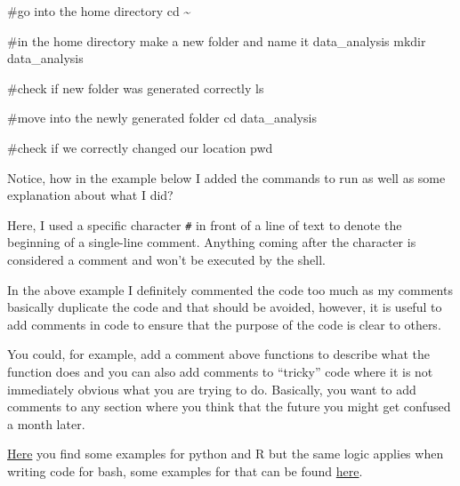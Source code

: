 \documentclass[
  letterpaper,
  DIV=11,
  numbers=noendperiod]{scrreprt}
\newenvironment{Shaded}{}{}
\newcommand{\BuiltInTok}[1]{\textcolor[rgb]{0.84,0.23,0.29}{#1}}
\newcommand{\CommentTok}[1]{\textcolor[rgb]{0.42,0.45,0.49}{#1}}
\newcommand{\FunctionTok}[1]{\textcolor[rgb]{0.44,0.26,0.76}{#1}}
\newcommand{\NormalTok}[1]{\textcolor[rgb]{0.14,0.16,0.18}{#1}}
\begin{document}
\begin{Shaded}
\begin{Highlighting}[]
\CommentTok{\#go into the home directory}
\BuiltInTok{cd}\NormalTok{ \textasciitilde{}}

\CommentTok{\#in the home directory make a new folder and name it data\_analysis}
\FunctionTok{mkdir}\NormalTok{ data\_analysis}

\CommentTok{\#check if new folder was generated correctly}
\FunctionTok{ls}

\CommentTok{\#move into the newly generated folder}
\BuiltInTok{cd}\NormalTok{ data\_analysis}

\CommentTok{\#check if we correctly changed our location}
\BuiltInTok{pwd}
\end{Highlighting}
\end{Shaded}

\begin{tcolorbox}[enhanced jigsaw, breakable, left=2mm, title=\textcolor{quarto-callout-tip-color}{\faLightbulb}\hspace{0.5em}{Tip: Commenting your code}, opacityback=0, opacitybacktitle=0.6, rightrule=.15mm, bottomrule=.15mm, colback=white, colframe=quarto-callout-tip-color-frame, coltitle=black, bottomtitle=1mm, arc=.35mm, toprule=.15mm, colbacktitle=quarto-callout-tip-color!10!white, toptitle=1mm, titlerule=0mm, leftrule=.75mm]

Notice, how in the example below I added the commands to run as well as
some explanation about what I did?

Here, I used a specific character \texttt{\#} in front of a line of text
to denote the beginning of a single-line comment. Anything coming after
the character is considered a comment and won't be executed by the
shell.

In the above example I definitely commented the code too much as my
comments basically duplicate the code and that should be avoided,
however, it is useful to add comments in code to ensure that the purpose
of the code is clear to others.

You could, for example, add a comment above functions to describe what
the function does and you can also add comments to ``tricky'' code where
it is not immediately obvious what you are trying to do. Basically, you
want to add comments to any section where you think that the future you
might get confused a month later.

\href{https://best-practice-and-impact.github.io/qa-of-code-guidance/code_documentation.html}{Here}
you find some examples for python and R but the same logic applies when
writing code for bash, some examples for that can be found
\href{https://linuxize.com/post/bash-comments/}{here}.

\end{tcolorbox}
\end{document}
